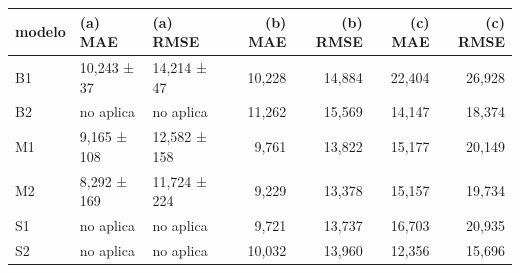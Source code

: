 \begin{tabular}{lllrrrr}
\toprule
modelo & (a) MAE & (a) RMSE & (b) MAE & (b) RMSE & (c) MAE & (c) RMSE \\
\midrule
B1 & 10,243 ± 37 & 14,214 ± 47 & 10,228 & 14,884 & 22,404 & 26,928 \\
B2 & no aplica & no aplica & 11,262 & 15,569 & 14,147 & 18,374 \\
M1 & 9,165 ± 108 & 12,582 ± 158 & 9,761 & 13,822 & 15,177 & 20,149 \\
M2 & 8,292 ± 169 & 11,724 ± 224 & 9,229 & 13,378 & 15,157 & 19,734 \\
S1 & no aplica & no aplica & 9,721 & 13,737 & 16,703 & 20,935 \\
S2 & no aplica & no aplica & 10,032 & 13,960 & 12,356 & 15,696 \\
\bottomrule
\end{tabular}